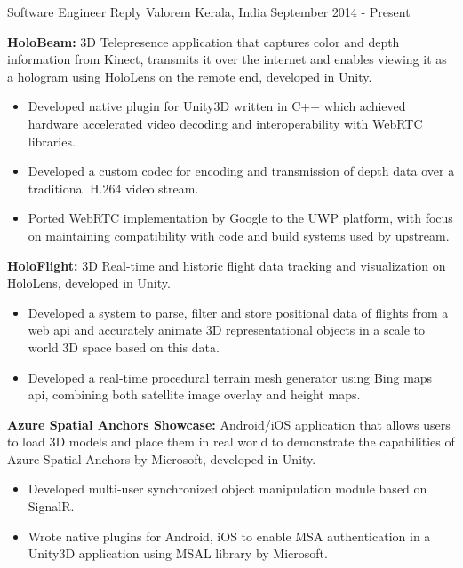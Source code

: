 \documentclass[11pt, a4paper]{awesome-cv}
\begin{document}
\begin{cventries}
	\cventry
	{Software Engineer} %
	{Reply Valorem} %
	{Kerala, India} %
	{September 2014 - Present} %
	{
		\begin{cvitems} %
			\item \textbf{HoloBeam:} 3D Telepresence application that captures color and depth information from Kinect, transmits it over the internet and enables viewing it as a hologram using HoloLens on the remote end, developed in Unity.
				\begin{itemize} 
					\item Developed native plugin for Unity3D written in C++ which achieved hardware accelerated video decoding and interoperability with WebRTC libraries.
					\item Developed a custom codec for encoding and transmission of depth data over a traditional H.264 video stream.
					\item Ported WebRTC implementation by Google to the UWP platform, with focus on maintaining compatibility with code and build systems used by upstream.
				\end{itemize}
			\item \textbf{HoloFlight:} 3D Real-time and historic flight data tracking and visualization on HoloLens, developed in Unity.
				\begin{itemize}
					\item Developed a system to parse, filter and store positional data of flights from a web api and accurately animate 3D representational objects in a scale to world 3D space based on this data.
					\item Developed a real-time procedural terrain mesh generator using Bing maps api, combining both satellite image overlay and height maps.
				\end{itemize}
			\item \textbf{Azure Spatial Anchors Showcase:} Android/iOS application that allows users to load 3D models and place them in real world to demonstrate the capabilities of Azure Spatial Anchors by Microsoft, developed in Unity.
				\begin{itemize}
					\item Developed multi-user synchronized object manipulation module based on SignalR.
					\item Wrote native plugins for Android, iOS to enable MSA authentication in a Unity3D application using MSAL library by Microsoft.

\end{itemize}
\end{cvitems}}
\end{cventries}
\end{document}
